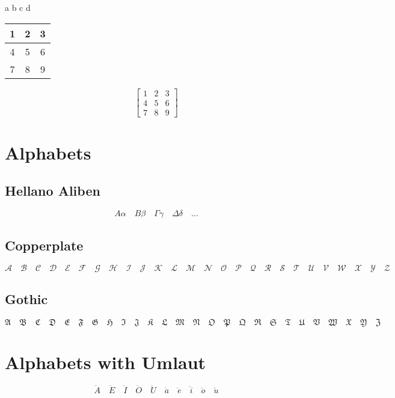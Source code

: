\documentclass[hyperref,a4paper,UTF8]{ctexart}
\begin{document}
\quad a \quad b \qquad c \qquad d %

\begin{tabular}{|c|c|c|} %
    \hline
    1 & 2 & 3 \\
    \hline
    4 & 5 & 6 \\
    \hline
    7 & 8 & 9 \\
    \hline
\end{tabular}

\begin{equation}
    \begin{bmatrix}
        1 & 2 & 3 \\
        4 & 5 & 6 \\
        7 & 8 & 9
    \end{bmatrix}
\end{equation}

\section{Alphabets}

\subsection{Hellano Aliben}

\[
A \alpha \quad B \beta \quad \Gamma \gamma \quad \Delta \delta \quad
\dots 
\]

\subsection{Copperplate}

\[
\mathcal{A} \quad \mathcal{B} \quad \mathcal{C} \quad \mathcal{D} \quad \mathcal{E} \quad \mathcal{F} \quad \mathcal{G} \quad \mathcal{H} \quad \mathcal{I} \quad \mathcal{J} \quad \mathcal{K} \quad \mathcal{L} \quad \mathcal{M} \quad \mathcal{N} \quad \mathcal{O} \quad \mathcal{P} \quad \mathcal{Q} \quad \mathcal{R} \quad \mathcal{S} \quad \mathcal{T} \quad \mathcal{U} \quad \mathcal{V} \quad \mathcal{W} \quad \mathcal{X} \quad \mathcal{Y} \quad \mathcal{Z}
\]

\subsection{Gothic}

\[
\mathfrak{A} \quad \mathfrak{B} \quad \mathfrak{C} \quad \mathfrak{D} \quad \mathfrak{E} \quad \mathfrak{F} \quad \mathfrak{G} \quad \mathfrak{H} \quad \mathfrak{I} \quad \mathfrak{J} \quad \mathfrak{K} \quad \mathfrak{L} \quad \mathfrak{M} \quad \mathfrak{N} \quad \mathfrak{O} \quad \mathfrak{P} \quad \mathfrak{Q} \quad \mathfrak{R} \quad \mathfrak{S} \quad \mathfrak{T} \quad \mathfrak{U} \quad \mathfrak{V} \quad \mathfrak{W} \quad \mathfrak{X} \quad \mathfrak{Y} \quad \mathfrak{Z}
\]

\section{Alphabets with Umlaut}

\[
\ddot{A} \quad \ddot{E} \quad \ddot{I} \quad \ddot{O} \quad \ddot{U} \quad \ddot{a} \quad \ddot{e} \quad \ddot{i} \quad \ddot{o} \quad \ddot{u}
\]
\end{document}
